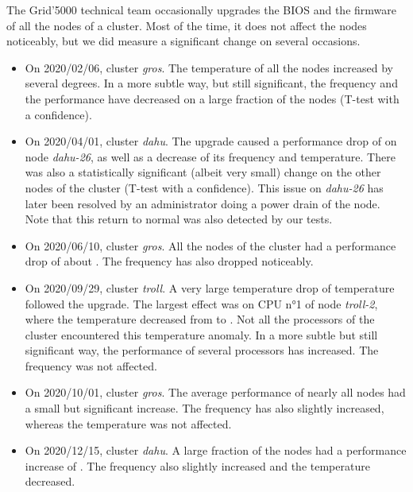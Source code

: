                 The Grid'5000 technical team occasionally upgrades the BIOS and the firmware of all the nodes of a
                cluster. Most of the time, it does not affect the nodes noticeably, but we did measure a
                significant change on several occasions.
                \begin{itemize}
                    \item On 2020/02/06, cluster \emph{gros}. The temperature of all the nodes increased by several
                        degrees. In a more subtle way, but still significant, the frequency and the \dgemm performance
                        have decreased on a large fraction of the nodes (T-test with a  confidence).
                    \item On 2020/04/01, cluster \emph{dahu}. The upgrade caused a performance drop of 
                        on node \emph{dahu-26}, as well as a decrease of its frequency and temperature. There was also a
                        statistically significant (albeit very small) change on the other nodes of the cluster (T-test
                        with a  confidence). This issue on \emph{dahu-26} has later been resolved by
                        an administrator doing a power drain of the node. Note that this return to normal was also
                        detected by our tests.
                    \item On 2020/06/10, cluster \emph{gros}. All the nodes of the cluster had a performance drop of
                        about . The frequency has also dropped noticeably.
                    \item On 2020/09/29, cluster \emph{troll}. A very large temperature drop of temperature followed the
                        upgrade. The largest effect was on CPU n°1 of node \emph{troll-2}, where the temperature
                        decreased from  to . Not all the processors of
                        the cluster encountered this temperature anomaly. In a more subtle but still significant way,
                        the \dgemm performance of several processors has increased. The frequency was not affected.
                    \item On 2020/10/01, cluster \emph{gros}. The average \dgemm performance of nearly all nodes had a
                        small but significant increase. The frequency has also slightly increased, whereas the
                        temperature was not affected.
                    \item On 2020/12/15, cluster \emph{dahu}. A large fraction of the nodes had a performance increase
                        of . The frequency also slightly increased and the temperature decreased.
                \end{itemize}


